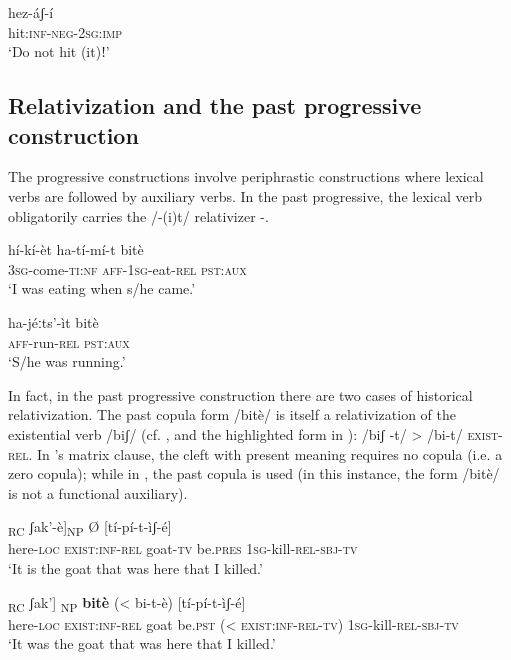 \documentclass[output=paper]{langsci/langscibook}
\begin{document}
\ea\label{ex:mahland:66}
\gll hez-áʃ-í\\
hit:\textsc{inf-neg-2sg:imp}\\
\glt `Do not hit (it)ǃ'
\z

\subsection{Relativization and the past progressive construction}\label{sec:mahland:3.2}

The progressive constructions involve periphrastic constructions where lexical verbs are followed by auxiliary verbs. In the past progressive, the lexical verb obligatorily carries the /-(i)t/ relativizer -.

\ea\label{ex:mahland:67}
\gll hí-kí-èt                 ha-tí-mí-t          bitè\\
\textsc{3sg}{}-come-\textsc{ti:nf}   \textsc{aff-1sg}{}-eat-\textsc{rel}   \textsc{pst:aux} \\
\glt `I was eating when s/he came.'
\z

\ea\label{ex:mahland:68}
\gll ha-jéːts'-ìt    bitè\\
\textsc{aff}{}-run-\textsc{rel}   \textsc{pst:aux}\\
\glt `S/he was running.'
\z

In fact, in the past progressive construction there are two cases of historical relativization. The past copula form /bitè/ is itself a relativization of the existential verb /biʃ/ (cf. \citealt[318; 461-462]{Ahland2012}, and the highlighted form in ): /biʃ -t/ {>} /bi-t/ \textsc{exist-rel}. In 's matrix clause, the cleft with present meaning requires no copula (i.e. a zero copula); while in , the past copula is used (in this instance, the form /bitè/ is not a functional auxiliary). 

\ea\label{ex:mahland:69}
\gll [[nà-àt       \textbf{bi-t}]\textsubscript{RC}               ʃak'-è]\textsubscript{NP} Ø    [tí-pí-t-ìʃ-é]
\\
{\db}{\db}here-\textsc{loc}    \textsc{exist}:\textsc{inf-rel}    goat-\textsc{tv}    be.\textsc{pres}  {\db}\textsc{1sg}{}-kill-\textsc{rel-sbj-tv}\\
\glt `It is the goat that was here that I killed.'
\z

\ea\label{ex:mahland:70}
\gll [[nà-àt    \textbf{bi-t}]\textsubscript{RC}             ʃak']\textsubscript{ NP}    \textbf{bitè}    ({\textless} bi-t-è)      [tí-pí-t-ìʃ-é]\\
{\db}{\db}here\textsc{{}-loc}   \textsc{exist:inf-rel}   goat    be.\textsc{pst}  ({\textless} \textsc{exist:inf-rel-tv})  {\db}\textsc{1sg}{}-kill-\textsc{rel-sbj-tv}\\
\glt `It was the goat that was here that I killed.'
\z
\end{document}
